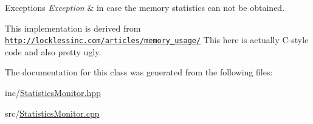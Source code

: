 \begin{DoxyExceptions}{Exceptions}
{\em Exception} & in case the memory statistics can not be obtained.\\
\hline
\end{DoxyExceptions}
This implementation is derived from \href{http://locklessinc.com/articles/memory_usage/}{\tt http\+://locklessinc.\+com/articles/memory\+\_\+usage/} This here is actually C-\/style code and also pretty ugly. 

The documentation for this class was generated from the following files\+:\begin{DoxyCompactItemize}
\item 
inc/\hyperlink{_statistics_monitor_8hpp}{Statistics\+Monitor.\+hpp}\item 
src/\hyperlink{_statistics_monitor_8cpp}{Statistics\+Monitor.\+cpp}\end{DoxyCompactItemize}
